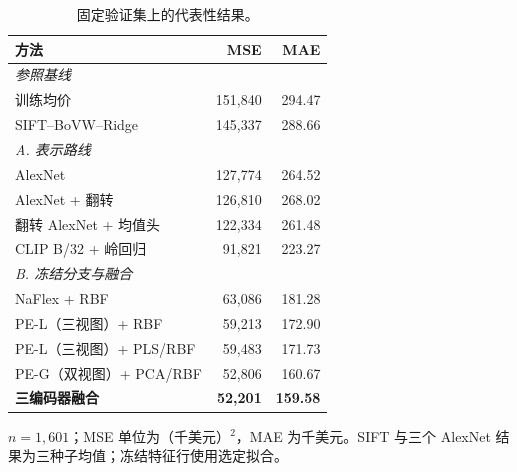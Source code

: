 \begin{table}[t]
\centering
\caption{固定验证集上的代表性结果。}
\label{tab:representative-results-zh}
\small
\setlength{\tabcolsep}{3pt}
\renewcommand{\arraystretch}{1.0}
\begin{tabular*}{\columnwidth}{@{\extracolsep{\fill}}lrr@{}}
\hline
方法 & MSE & MAE \\
\hline
\multicolumn{3}{l}{\emph{参照基线}} \\
训练均价 & 151,840 & 294.47 \\
SIFT--BoVW--Ridge & 145,337 & 288.66 \\
\multicolumn{3}{l}{\emph{A. 表示路线}} \\
AlexNet & 127,774 & 264.52 \\
AlexNet + 翻转 & 126,810 & 268.02 \\
翻转 AlexNet + 均值头 & 122,334 & 261.48 \\
CLIP B/32 + 岭回归 & 91,821 & 223.27 \\
\multicolumn{3}{l}{\emph{B. 冻结分支与融合}} \\
NaFlex + RBF & 63,086 & 181.28 \\
PE-L（三视图）+ RBF & 59,213 & 172.90 \\
PE-L（三视图）+ PLS/RBF & 59,483 & 171.73 \\
PE-G（双视图）+ PCA/RBF & 52,806 & 160.67 \\
\textbf{三编码器融合} & \textbf{52,201} & \textbf{159.58} \\
\hline
\end{tabular*}
\par\smallskip
\begin{minipage}{\columnwidth}\scriptsize
$n=1{,}601$；MSE 单位为（千美元）$^2$，MAE 为千美元。SIFT 与三个 AlexNet 结果为三种子均值；冻结特征行使用选定拟合。
\end{minipage}
\end{table}
